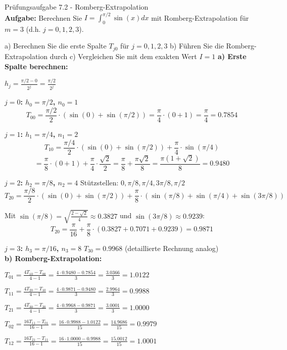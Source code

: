 \begin{example2}{Prüfungsaufgabe 7.2 - Romberg-Extrapolation}\\
\textbf{Aufgabe:} Berechnen Sie $I = \int_0^{\pi/2} \sin(x) dx$ mit Romberg-Extrapolation für $m = 3$ (d.h. $j = 0, 1, 2, 3$).

a) Berechnen Sie die erste Spalte $T_{j0}$ für $j = 0, 1, 2, 3$
b) Führen Sie die Romberg-Extrapolation durch
c) Vergleichen Sie mit dem exakten Wert $I = 1$
\tcblower
\textbf{a) Erste Spalte berechnen:}

$h_j = \frac{\pi/2 - 0}{2^j} = \frac{\pi/2}{2^j}$

\textbf{$j = 0$: $h_0 = \pi/2$, $n_0 = 1$}
$$T_{00} = \frac{\pi/2}{2} \cdot (\sin(0) + \sin(\pi/2)) = \frac{\pi}{4} \cdot (0 + 1) = \frac{\pi}{4} = 0.7854$$

\textbf{$j = 1$: $h_1 = \pi/4$, $n_1 = 2$}
$$T_{10} = \frac{\pi/4}{2} \cdot (\sin(0) + \sin(\pi/2)) + \frac{\pi}{4} \cdot \sin(\pi/4)$$
$$= \frac{\pi}{8} \cdot (0 + 1) + \frac{\pi}{4} \cdot \frac{\sqrt{2}}{2} = \frac{\pi}{8} + \frac{\pi\sqrt{2}}{8} = \frac{\pi(1 + \sqrt{2})}{8} = 0.9480$$

\textbf{$j = 2$: $h_2 = \pi/8$, $n_2 = 4$}
Stützstellen: $0, \pi/8, \pi/4, 3\pi/8, \pi/2$
$$T_{20} = \frac{\pi/8}{2} \cdot (\sin(0) + \sin(\pi/2)) + \frac{\pi}{8} \cdot (\sin(\pi/8) + \sin(\pi/4) + \sin(3\pi/8))$$

Mit $\sin(\pi/8) = \sqrt{\frac{2 - \sqrt{2}}{4}} \approx 0.3827$ und $\sin(3\pi/8) \approx 0.9239$:
$$T_{20} = \frac{\pi}{16} + \frac{\pi}{8} \cdot (0.3827 + 0.7071 + 0.9239) = 0.9871$$

\textbf{$j = 3$: $h_3 = \pi/16$, $n_3 = 8$}
$T_{30} = 0.9968$ (detaillierte Rechnung analog)
\vspace{2mm}\\
\textbf{b) Romberg-Extrapolation:}

$T_{01} = \frac{4T_{10} - T_{00}}{4 - 1} = \frac{4 \cdot 0.9480 - 0.7854}{3} = \frac{3.0366}{3} = 1.0122$

$T_{11} = \frac{4T_{20} - T_{10}}{4 - 1} = \frac{4 \cdot 0.9871 - 0.9480}{3} = \frac{2.9964}{3} = 0.9988$

$T_{21} = \frac{4T_{30} - T_{20}}{4 - 1} = \frac{4 \cdot 0.9968 - 0.9871}{3} = \frac{3.0001}{3} = 1.0000$

$T_{02} = \frac{16T_{11} - T_{01}}{16 - 1} = \frac{16 \cdot 0.9988 - 1.0122}{15} = \frac{14.9686}{15} = 0.9979$

$T_{12} = \frac{16T_{21} - T_{11}}{16 - 1} = \frac{16 \cdot 1.0000 - 0.9988}{15} = \frac{15.0012}{15} = 1.0001$


\end{example2}
